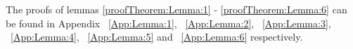 %
%


The proofs of lemmas \ref{proofTheorem:Lemma:1} - \ref{proofTheorem:Lemma:6} can be found in Appendix ~\ref{App:Lemma:1}, ~\ref{App:Lemma:2}, ~\ref{App:Lemma:3}, ~\ref{App:Lemma:4}, ~\ref{App:Lemma:5} and
 ~\ref{App:Lemma:6} respectively.


